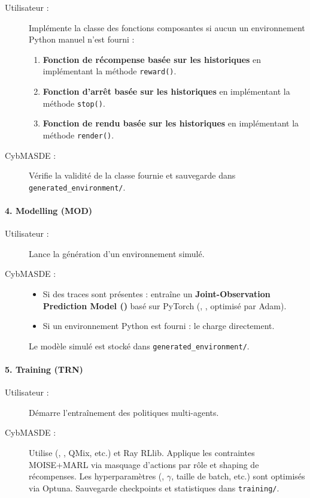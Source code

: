 \begin{description}
    \item[Utilisateur :] Implémente la classe des fonctions composantes si aucun un environnement Python manuel n’est fourni :
        \begin{enumerate}
            \item \textbf{Fonction de récompense basée sur les historiques} en implémentant la méthode \texttt{reward()}.
            \item \textbf{Fonction d'arrêt basée sur les historiques} en implémentant la méthode \texttt{stop()}.
            \item \textbf{Fonction de rendu basée sur les historiques} en implémentant la méthode \texttt{render()}.
        \end{enumerate}
    \item[CybMASDE :] Vérifie la validité de la classe fournie et sauvegarde dans \texttt{generated\_environment/}.
\end{description}

\paragraph{4. Modelling (MOD)}
\begin{description}
    \item[Utilisateur :] Lance la génération d’un environnement simulé.
    \item[CybMASDE :]
        \begin{itemize}
            \item Si des traces sont présentes : entraîne un \textbf{Joint-Observation Prediction Model ()} basé sur PyTorch (, ,  optimisé par Adam).
            \item Si un environnement Python est fourni : le charge directement.
        \end{itemize}
        Le modèle simulé est stocké dans \texttt{generated\_environment/}.
\end{description}

\paragraph{5. Training (TRN)}
\begin{description}
    \item[Utilisateur :] Démarre l’entraînement des politiques multi-agents.
    \item[CybMASDE :] Utilise  (, , QMix, etc.) et Ray RLlib. Applique les contraintes MOISE+MARL via masquage d’actions par rôle et shaping de récompenses. Les hyperparamètres (, $\gamma$, taille de batch, etc.) sont optimisés via Optuna. Sauvegarde checkpoints et statistiques dans \texttt{training/}.
\end{description}


